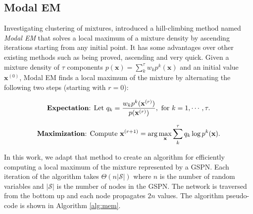\documentclass[12pt]{article}
\begin{document}
\subsection{Modal EM}
\label{subsec:mem}

Investigating clustering of mixtures, \cite{Li2007} introduced a hill-climbing method named \emph{Modal EM} that solves a local maximum of a mixture density by ascending iterations starting from any initial point. It has some advantages over other existing methods such as being proved, ascending and very quick.
%
Given a mixture density of $\tau$ components $p(\mathbf{x}) = \sum_k^\tau w_k p^k(\mathbf{x})$ and an initial value $\mathbf{x}^{(0)}$, Modal EM finds a local maximum of the mixture by alternating the following two steps (starting with $r = 0$):

        \begin{equation}
        \text{\textbf{Expectation}: Let }
          q_k = \frac{w_k p^k(\mathbf{x}^{(r)})}{p(\mathbf{x}^{(r)})},
          \text{ for } k = 1, \cdots, \tau.
        \end{equation}

        \begin{equation}
        \text{\textbf{Maximization}: Compute }
          \mathbf{x}^{(r+1)} = \arg\max_\mathbf{x} \sum_k^\tau q_k \log p^k(\mathbf{x}).
        \end{equation}

In this work, we adapt that method to create an algorithm for efficiently computing a local maximum of the mixture represented by a GSPN. Each iteration of the algorithm takes $\Theta(n |\mathcal{S}|)$ where $n$ is the number of random variables and $|\mathcal{S}|$ is the number of nodes in the GSPN. The network is traversed from the bottom up and each node propagates $2n$ values. The algorithm pseudo-code is shown in Algorithm \ref{alg:mem}.
\end{document}
